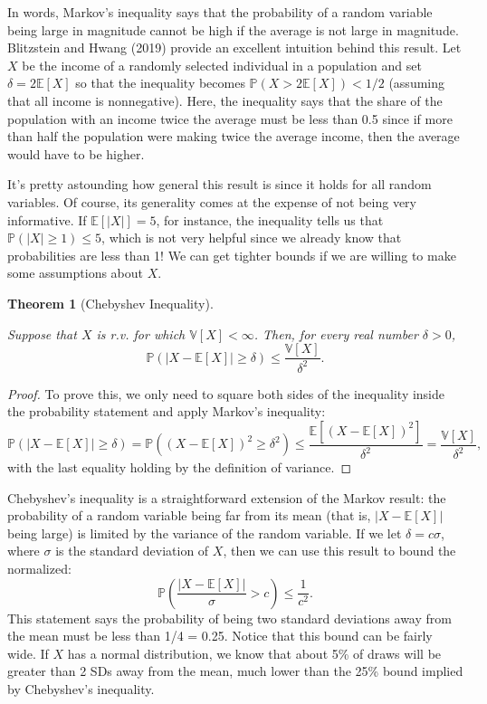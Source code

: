 \documentclass[
  letterpaper,
  DIV=11,
  numbers=noendperiod]{scrreprt}
\newcommand{\E}{\mathbb{E}}
\newcommand{\V}{\mathbb{V}}
\renewcommand{\P}{\mathbb{P}}
\theoremstyle{definition}
\theoremstyle{plain}
\newtheorem{theorem}{Theorem}[chapter]
\theoremstyle{definition}
\theoremstyle{remark}
\begin{document}
In words, Markov's inequality says that the probability of a random
variable being large in magnitude cannot be high if the average is not
large in magnitude. Blitzstein and Hwang (2019) provide an excellent
intuition behind this result. Let \(X\) be the income of a randomly
selected individual in a population and set \(\delta = 2\E[X]\) so that
the inequality becomes \(\P(X > 2\E[X]) < 1/2\) (assuming that all
income is nonnegative). Here, the inequality says that the share of the
population with an income twice the average must be less than 0.5 since
if more than half the population were making twice the average income,
then the average would have to be higher.

It's pretty astounding how general this result is since it holds for all
random variables. Of course, its generality comes at the expense of not
being very informative. If \(\E[|X|] = 5\), for instance, the inequality
tells us that \(\P(|X| \geq 1) \leq 5\), which is not very helpful since
we already know that probabilities are less than 1! We can get tighter
bounds if we are willing to make some assumptions about \(X\).

\begin{theorem}[Chebyshev
Inequality]\protect\hypertarget{thm-chebyshev}{}\label{thm-chebyshev}

Suppose that \(X\) is r.v. for which \(\V[X] < \infty\). Then, for every
real number \(\delta > 0\), \[
\P(|X-\E[X]| \geq \delta) \leq \frac{\V[X]}{\delta^2}.
\]

\end{theorem}

\begin{proof}

To prove this, we only need to square both sides of the inequality
inside the probability statement and apply Markov's inequality: \[
\P\left( |X - \E[X]| \geq \delta \right) = \P((X-\E[X])^2 \geq \delta^2) \leq \frac{\E[(X - \E[X])^2]}{\delta^2} = \frac{\V[X]}{\delta^2},
\] with the last equality holding by the definition of variance.

\end{proof}

Chebyshev's inequality is a straightforward extension of the Markov
result: the probability of a random variable being far from its mean
(that is, \(|X-\E[X]|\) being large) is limited by the variance of the
random variable. If we let \(\delta = c\sigma\), where \(\sigma\) is the
standard deviation of \(X\), then we can use this result to bound the
normalized: \[
\P\left(\frac{|X - \E[X]|}{\sigma} > c \right) \leq \frac{1}{c^2}.
\] This statement says the probability of being two standard deviations
away from the mean must be less than 1/4 = 0.25. Notice that this bound
can be fairly wide. If \(X\) has a normal distribution, we know that
about 5\% of draws will be greater than 2 SDs away from the mean, much
lower than the 25\% bound implied by Chebyshev's inequality.
\end{document}
